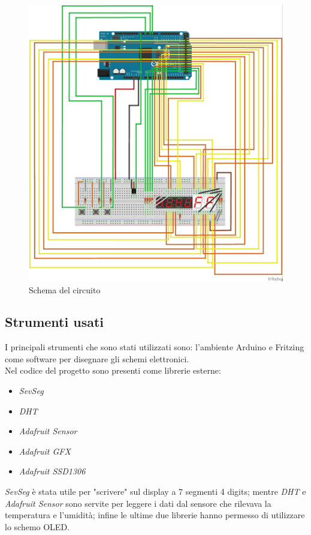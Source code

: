 \documentclass[paper=a4, fontsize=10pt]{scrartcl}
\begin{document}
\begin{figure}
  \includegraphics[width=\linewidth]{MySchema.jpg}
  \caption{Schema del circuito}
  \label{fig:schema1}
\end{figure}
    



\subsection{Strumenti usati}
I principali strumenti che sono stati utilizzati sono: l'ambiente Arduino e Fritzing come software per disegnare gli schemi elettronici.\\
Nel codice del progetto sono presenti come librerie esterne:
\begin{itemize}
\item \textit{SevSeg}
\item \textit{DHT}
\item \textit{Adafruit Sensor}
\item \textit{Adafruit GFX}
\item \textit{Adafruit SSD1306}
\end{itemize}

\textit{SevSeg} è stata utile per "scrivere" sul display a 7 segmenti 4 digits; mentre \textit{DHT} e \textit{Adafruit Sensor} sono servite per leggere i dati dal sensore che rilevava la temperatura e l'umidità; infine  le ultime due librerie hanno permesso di utilizzare lo schemo OLED. 
\end{document}
